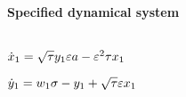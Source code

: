 
\begin{math}
\end{math}
\paragraph{Specified dynamical system}
\begin{math}
\end{math}\par

\begin{math}
\dot x_{1}=\sqrt {\tau } y_{1} \varepsilon a-\varepsilon^{2} \tau  x_{1}
\end{math}\par

\begin{math}
\dot y_{1}=w_{1} \sigma -y_{1}+\sqrt {\tau } \varepsilon x_{1}
\end{math}\par
